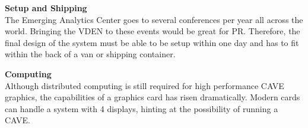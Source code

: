 \filbreak
\noindent\textbf{Setup and Shipping}\\
	The Emerging Analytics Center goes to several conferences per year all across the world. Bringing the VDEN to these events would be great for PR. Therefore, the final design of the system must be able to be setup within one day and has to fit within the back of a van or shipping container.

\filbreak
\noindent\textbf{Computing}\\
	Although distributed computing is still required for high performance CAVE graphics, the capabilities of a graphics card has risen dramatically. Modern cards can handle a system with 4 displays, hinting at the possibility of running a CAVE.


\filbreak
{} \\

\clearpage
